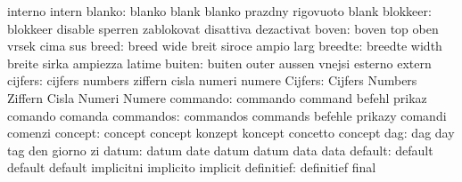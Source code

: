                            interno                   intern
                   blanko: blanko                    blank
                           blanko                    prazdny
                           rigovuoto                 blank
                 blokkeer: blokkeer                  disable
                           sperren                   zablokovat
                           disattiva                 dezactivat
                    boven: boven                     top
                           oben                      vrsek
                           cima                      sus
                    breed: breed                     wide
                           breit                     siroce
                           ampio                     larg
                  breedte: breedte                   width
                           breite                    sirka
                           ampiezza                  latime
                   buiten: buiten                    outer
                           aussen                    vnejsi
                           esterno                   extern
                  cijfers: cijfers                   numbers
                           ziffern                   cisla
                           numeri                    numere
                  Cijfers: Cijfers                   Numbers
                           Ziffern                   Cisla
                           Numeri                    Numere
                 commando: commando                  command
                           befehl                    prikaz
                           comando                   comanda
                commandos: commandos                 commands
                           befehle                   prikazy
                           comandi                   comenzi
                  concept: concept                   concept
                           konzept                   koncept
                           concetto                  concept
                      dag: dag                       day
                           tag                       den
                           giorno                    zi
                    datum: datum                     date
                           datum                     datum
                           data                      data
                  default: default                   default
                           default                   implicitni
                           implicito                 implicit
               definitief: definitief                final
